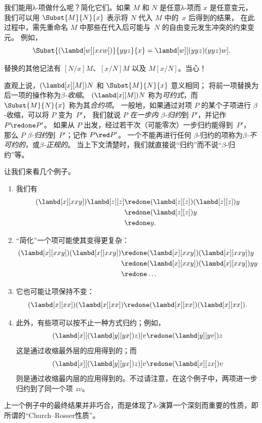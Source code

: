 \documentclass[../../../include/open-logic-section]{subfiles}
\begin{document}

我们能用λ-项做什么呢？简化它们。如果 $M$ 和 $N$ 是任意λ-项而 $x$ 是任意变元，
我们可以用 $\Subst{M}{N}{x}$ 表示将 $N$ 代入 $M$ 中的~$x$ 后得到的结果，
在此过程中，需先重命名 $M$ 中那些在代入后可能与~$N$ 的自由变元发生冲突的约束变元。
例如，
\[
\Subst{(\lambd[w][xxw])}{yyz}{x} = \lambd[w][(yyz)(yyz)w].
\]

\begin{digress}
替换的其他记法有 $[N/x]M$、$[x/N]M$ 以及 $M[x/N]$。当心！
\end{digress}

直观上说，$(\lambd[x][M])N$ 和 $\Subst{M}{N}{x}$ 意义相同；
将前一项替换为后一项的操作称为\emph{$\beta$-收缩}。
$(\lambd[x][M])N$ 称为\emph{可约式}，而 $\Subst{M}{N}{x}$ 称为其\emph{合约项}。
一般地，如果通过对项 $P$ 的某个子项进行 $\beta$-收缩，可以将 $P$ 变为~$P'$，
我们就说 $P$ \emph{在一步内 $\beta$-归约}到 $P'$，并记作 $P \redone P'$。
如果从 $P$ 出发，经过若干次（可能零次）一步归约能得到~$P'$，
那么 $P$ \emph{$\beta$-归约}到~$P'$；记作 $P \red P'$。
一个不能再进行任何 $\beta$-归约的项称为\emph{$\beta$-不可约的}，或\emph{$\beta$-正规的}。
当上下文清楚时，我们就直接说“归约”而不说“$\beta$-归约”等。

让我们来看几个例子。
\begin{enumerate}
\item 我们有
\begin{align*}
(\lambd[x][xxy]) \lambd[z][z] & \redone (\lambd[z][z])(\lambd[z][z]) y \\
& \redone (\lambd[z][z]) y \\
& \redone y.
\end{align*}
\item “简化”一个项可能使其变得更复杂：
\begin{align*}
(\lambd[x][xxy])(\lambd[x][xxy]) & \redone (\lambd[x][xxy])(\lambd[x][xxy])y \\
& \redone (\lambd[x][xxy])(\lambd[x][xxy])yy \\
& \redone \dots
\end{align*}
\item 它也可能让项保持不变：
\[
(\lambd[x][xx])(\lambd[x][xx]) \redone (\lambd[x][xx])(\lambd[x][xx]).
\]
\item 此外，有些项可以按不止一种方式归约；例如，
\[
(\lambd[x][(\lambd[y][yx]) z)] v \redone (\lambd[y][yv]) z
\]
这是通过收缩最外层的应用得到的；而
\[
(\lambd[x][(\lambd[y][yx]) z)] v \redone (\lambd[x][zx]) v
\]
则是通过收缩最内层的应用得到的。不过请注意，在这个例子中，两项进一步归约到了同一个项 $zv$。
\end{enumerate}

上一个例子中的最终结果并非巧合，而是体现了λ-演算一个深刻而重要的性质，即所谓的“Church--Rosser性质”。
\end{document}
